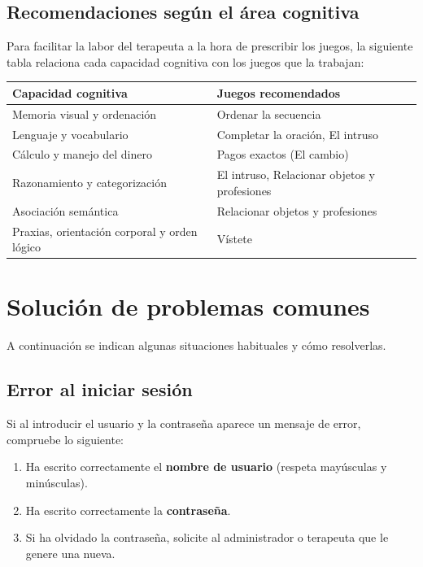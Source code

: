 \subsection{Recomendaciones según el área cognitiva}

Para facilitar la labor del terapeuta a la hora de prescribir los juegos, la siguiente tabla relaciona cada capacidad cognitiva con los juegos que la trabajan:

\begin{center}
\begin{tabularx}{\textwidth}{|X|X|}
    \hline
    \textbf{Capacidad cognitiva} & \textbf{Juegos recomendados} \\
    \hline
    Memoria visual y ordenación & Ordenar la secuencia \\
    \hline
    Lenguaje y vocabulario & Completar la oración, El intruso \\
    \hline
    Cálculo y manejo del dinero & Pagos exactos (El cambio) \\
    \hline
    Razonamiento y categorización & El intruso, Relacionar objetos y profesiones \\
    \hline
    Asociación semántica & Relacionar objetos y profesiones \\
    \hline
    Praxias, orientación corporal y orden lógico & Vístete \\
    \hline
\end{tabularx}
\end{center}

\section{Solución de problemas comunes}

A continuación se indican algunas situaciones habituales y cómo resolverlas.

\subsection{Error al iniciar sesión}

Si al introducir el usuario y la contraseña aparece un mensaje de error, compruebe lo siguiente:

\begin{enumerate}
    \item Ha escrito correctamente el \textbf{nombre de usuario} (respeta mayúsculas y minúsculas).
    \item Ha escrito correctamente la \textbf{contraseña}.
    \item Si ha olvidado la contraseña, solicite al administrador o terapeuta que le genere una nueva.
\end{enumerate}

